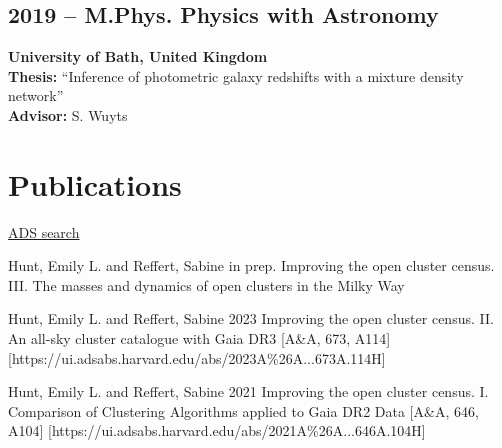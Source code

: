 \documentclass[12pt, letterpaper]{hunt-cv}
\begin{document}
\subsection*{2019 -- M.Phys. Physics with Astronomy}
\begin{addmargin}[1em]{0em}
    \textbf{University of Bath, United Kingdom}\\
    \textbf{Thesis:} ``Inference of photometric galaxy redshifts with a
    mixture density network''\\
    \textbf{Advisor:} S. Wuyts
\end{addmargin}




\section*{Publications}

\href{\cvADSLink}{ADS search \faLink}


\begin{etaremune}
    \item \publication
        {Hunt, Emily L. and Reffert, Sabine}
        {in prep.}
        {Improving the open cluster census. III. The masses and dynamics of open clusters in the Milky Way}
    \item \publication
        {Hunt, Emily L. and Reffert, Sabine}
        {2023}
        {Improving the open cluster census. II. An all-sky cluster catalogue with Gaia DR3}
        [A\&A, 673, A114]
        [https://ui.adsabs.harvard.edu/abs/2023A\%26A...673A.114H]
    \item \publication
        {Hunt, Emily L. and Reffert, Sabine}
        {2021}
        {Improving the open cluster census. I. Comparison of Clustering Algorithms applied to Gaia DR2 Data}
        [A\&A, 646, A104]
        [https://ui.adsabs.harvard.edu/abs/2021A\%26A...646A.104H]
\end{etaremune}
\end{document}
